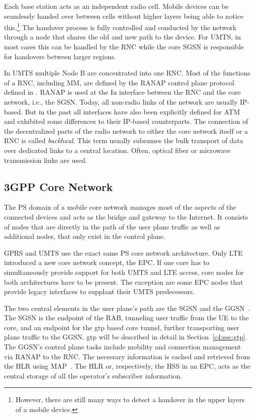 Each base station acts as an independent radio cell. Mobile devices can be seamlessly handed over between cells without higher layers being able to notice this.\footnote{However, there are still many ways to detect a handover in the upper layers of a mobile device.} The handover process is fully controlled and conducted by the network through a node that shares the old and new path to the device. For \gls{UMTS}, in most cases this can be handled by the \gls{RNC} while the core \gls{SGSN} is responsible for handovers between larger regions.

In \gls{UMTS} multiple Node B are concentrated into one \gls{RNC}. Most of the functions of a \gls{RNC}, including \gls{MM}, are defined by the \gls{RANAP} control plane protocol defined in \cite{3gpp.25.413}. \gls{RANAP} is used at the Iu interface between the \gls{RNC} and the core network, i.e., the \gls{SGSN}. Today, all non-radio links of the network are usually \gls{IP}-based. But in the past all interfaces have also been explicitly defined for \gls{ATM} and exhibited some differences to their \gls{IP}-based counterparts. The connection of the decentralized parts of the radio network to either the core network itself or a \gls{RNC} is called \textit{backhaul}. This term usually subsumes the bulk transport of data over dedicated links to a central location. Often, optical fiber or microwave transmission links are used.


\subsection{\texorpdfstring{\acrshort{3GPP}}{3GPP} Core Network}

The \gls{PS} domain of a mobile core network manages most of the aspects of the connected devices and acts as the bridge and gateway to the Internet. It consists of nodes that are directly in the path of the user plane traffic as well as additional nodes, that only exist in the control plane.

\gls{GPRS} and \gls{UMTS} use the exact same \gls{PS} core network architecture. Only \gls{LTE} introduced a new core network concept, the \gls{EPC}. If one core has to simultaneously provide support for both \gls{UMTS} and \gls{LTE} access, core nodes for both architectures have to be present. The exception are some \gls{EPC} nodes that provide legacy interfaces to supplant their \gls{UMTS} predecessors.

The two central elements in the user plane's path are the \gls{SGSN} and the \gls{GGSN}~\cite{3gpp.22.060,3gpp.23.060}. The \gls{SGSN} is the endpoint of the \gls{RAB}, tunneling user traffic from the \gls{UE} to the core, and an endpoint for the \gls{gtp} based core tunnel, further transporting user plane traffic to the \gls{GGSN}. \Gls{gtp} will be described in detail in Section~\ref{c4:sec:gtp}. The \gls{GGSN}'s control plane tasks include mobility and connection management via \gls{RANAP} to the \gls{RNC}. The necessary information is cached and retrieved from the \gls{HLR} using \gls{MAP}~\cite{3gpp.29.002}. The \gls{HLR} or, respectively, the \gls{HSS} in an \gls{EPC}, acts as the central storage of all the operator's subscriber information.

